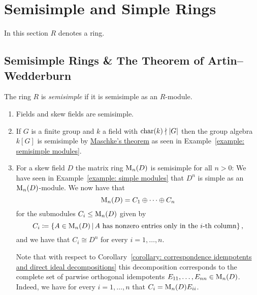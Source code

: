 \section{Semisimple and Simple Rings}


\begin{conventions}
  In this section $R$ denotes a ring.
\end{conventions}





\subsection{Semisimple Rings \& The Theorem of Artin--Wedderburn}


\begin{definition}
  The ring $R$ is \emph{semisimple} if it is semisimple as an $R$-module.
\end{definition}


\begin{example}
  \label{example: semisimple rings}
  \leavevmode
  \begin{enumerate}
    \item
      Fields and skew fields are semisimple.
    \item
      If $G$ is a finite group and $k$ a field with $\operatorname{char}(k) \nmid |G|$ then the group algebra $k[G]$ is semisimple by \hyperref[theorem: maschkes theorem]{Maschke’s theorem} as seen in Example~\ref{example: semisimple modules}.
    \item
      For a skew field $D$ the matrix ring $\operatorname{M}_n(D)$ is semisimple for all $n > 0$:
      We have seen in Example~\ref{example: simple modules} that $D^n$ is simple as an $\operatorname{M}_n(D)$-module.
      We now have that
      \[
          \operatorname{M}_n(D)
        = C_1 \oplus \dotsb \oplus C_n
      \]
      for the submodules $C_i \leq \operatorname{M}_n(D)$ given by 
      \[
                  C_i
        \defined  \{
                    A \in \Mat_n(D)
                  \suchthat
                    \text{$A$ has nonzero entries only in the $i$-th column}
                  \} \,,
      \]
      and we have that $C_i \cong D^n$ for every $i = 1, \dotsc, n$.
      
      Note that with respect to Corollary~\ref{corollary: correspondence idempotents and direct ideal decompositions} this decomposition corresponds to the complete set of parwise orthogonal idempotents $E_{11}, \dotsc, E_{nn} \in \operatorname{M}_n(D)$.
      Indeed, we have for every $i = 1, \dotsc, n$ that $C_i = \operatorname{M}_n(D) E_{ii}$.
  \end{enumerate}
\end{example}





